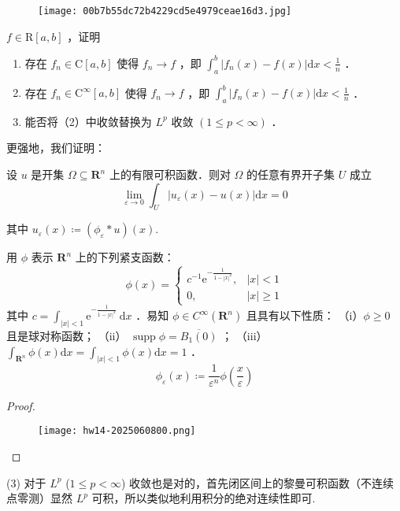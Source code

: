 \begin{figure}[H]
\centering
\texttt{[image: 00b7b55dc72b4229cd5e4979ceae16d3.jpg]}
\label{}
\end{figure}

\begin{exercise}
$f \in \mathrm{R}[a, b]$ ，证明
	\begin{enumerate}
		\item 存在 $f_n \in \mathrm{C}[a, b]$ 使得 $f_n \rightarrow f$ ，即 $\int_a^b\left|f_n(x)-f(x)\right| \mathrm{d} x<\frac{1}{n}$ ．
		\item 存在 $f_n \in \mathrm{C}^{\infty}[a, b]$ 使得 $f_n \rightarrow f$ ，即 $\int_a^b\left|f_n(x)-f(x)\right| \mathrm{d} x<\frac{1}{n}$ ．
		\item 能否将（2）中收敛替换为 $L^p$ 收敛 $(1 \leq p<\infty)$ ．
	\end{enumerate}
\end{exercise}
更强地，我们证明：

\begin{theorem}
设 $u$ 是开集 $\Omega \subseteq \mathbf{R}^n$ 上的有限可积函数．则对 $\Omega$ 的任意有界开子集 $U$ 成立
\[
\lim _{\varepsilon \rightarrow 0} \int_U\left|u_{\varepsilon}(x)-u(x)\right| \mathrm{d} x=0
\]
\end{theorem}
其中 $u_{\varepsilon}(x)\coloneqq (\phi_{\varepsilon}*u)(x)$.

用 $\phi$ 表示 $\mathbf{R}^n$ 上的下列紧支函数：
\[
\phi(x)= \begin{cases}c^{-1} \mathrm{e}^{-\frac{1}{1-|x|^2}}, & |x|<1 \\ 0, & |x| \geqslant 1\end{cases}
\]
其中 $c=\int_{|x|<1} \mathrm{e}^{-\frac{1}{1-|x|^2}} \mathrm{~d} x$ ．易知 $\phi \in C^{\infty}\left(\mathbf{R}^n\right)$ 且具有以下性质：
（i）$\phi \geqslant 0$ 且是球对称函数；
（ii） $\operatorname{supp} \phi=\overline{B_1(0)}$ ；
（iii） $\int_{\mathbf{R}^n} \phi(x) \mathrm{d} x=\int_{|x|<1} \phi(x) \mathrm{d} x=1$ ．
\[
\phi_{\varepsilon}(x)\coloneqq \frac{1}{\varepsilon^{n}}\phi\left( \frac{x}{\varepsilon} \right)
\]
\begin{proof}
\begin{figure}[H]
\centering
\texttt{[image: hw14-2025060800.png]}
\label{}
\end{figure}

\end{proof}
(3) 对于 $L^{p}$ ($1\leq p<\infty$) 收敛也是对的，首先闭区间上的黎曼可积函数（不连续点零测）显然 $L^{p}$ 可积，所以类似地利用积分的绝对连续性即可.

